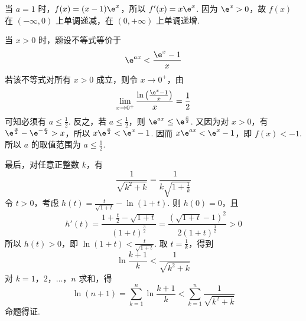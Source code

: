 \begin{solution}
当 \(a=1\) 时，\(f(x)=(x-1)\e^x\)，所以
\(f'(x)=x\e^x\). 因为 \(\e^x>0\)，故 \(f(x)\) 在 \((-\infty,0)\) 上单调递减，在 \((0,+\infty)\) 上单调递增.

当 \(x>0\) 时，题设不等式等价于
\[
\e^{ax}<\frac{\e^x-1}{x}
\]
若该不等式对所有 \(x>0\) 成立，则令 \(x\to0^+\)，由
\[
\lim_{x\to0^+}\frac{\ln\left(\frac{\e^x-1}{x}\right)}{x}=\frac12
\]
可知必须有 \(a\le\frac12\). 反之，若 \(a\le\frac12\)，则
\(\e^{ax}\le\e^{\frac{x}{2}}\). 又因为对 \(x>0\)，有
\(\e^{\frac{x}{2}}-\e^{-\frac{x}{2}}>x\)，所以
\(x\e^{\frac{x}{2}}<\e^x-1\). 因而 \(x\e^{ax}<\e^x-1\)，即 \(f(x)<-1\). 所以 \(a\) 的取值范围为 \(a\le\frac12\).

最后，对任意正整数 \(k\)，有
\[
\frac1{\sqrt{k^2+k}}=\frac1{k\sqrt{1+\frac{1}{k}}}
\]
令 \(t>0\)，考虑
\(h(t)=\frac{t}{\sqrt{1+t}}-\ln(1+t)\). 则 \(h(0)=0\)，且
\[
h'(t)=\frac{1+\frac{t}{2}-\sqrt{1+t}}{(1+t)^{\frac{3}{2}}}=\frac{\left(\sqrt{1+t}-1\right)^2}{2(1+t)^{\frac{3}{2}}}>0
\]
所以 \(h(t)>0\)，即
\(\ln(1+t)<\frac{t}{\sqrt{1+t}}\). 取 \(t=\frac1k\)，得到
\[
\ln\frac{k+1}{k}<\frac1{\sqrt{k^2+k}}
\]
对 \(k=1\)，\(2\)，\(\ldots\)，\(n\) 求和，得
\[
\ln(n+1)=\sum_{k=1}^n\ln\frac{k+1}{k}<\sum_{k=1}^n\frac1{\sqrt{k^2+k}}
\]
命题得证.
\end{solution}
